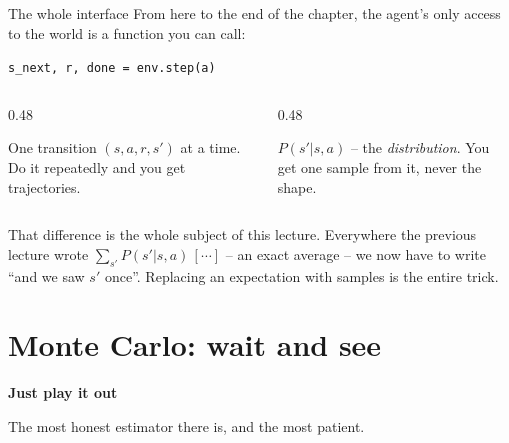 \documentclass[aspectratio=169]{beamer}
\begin{document}
\begin{frame}{The whole interface}
  \small
  From here to the end of the chapter, the agent's only access to the world is a function you
  can call:

  \vskip 6pt
  \begin{center}
  \begin{tcolorbox}[colback=lightbg, colframe=popblue, boxrule=0.7pt, arc=2pt, width=0.72\textwidth]
    \begin{center}
      \texttt{s\_next, r, done = env.step(a)}
    \end{center}
  \end{tcolorbox}
  \end{center}

  \vskip 8pt
  \begin{columns}[T]
    \begin{column}{0.48\textwidth}
      \begin{tcolorbox}[colback=paramgreen!8, colframe=paramgreen, boxrule=0.6pt, arc=2pt,
                        title={\textbf{What you can see}}]
        \small
        One transition $(s, a, r, s')$ at a time. Do it repeatedly and you get trajectories.
      \end{tcolorbox}
    \end{column}
    \begin{column}{0.48\textwidth}
      \begin{tcolorbox}[colback=armred!8, colframe=armred, boxrule=0.6pt, arc=2pt,
                        title={\textbf{What you cannot see}}]
        \small
        $P(s'|s,a)$ -- the \emph{distribution}. You get one sample from it, never the shape.
      \end{tcolorbox}
    \end{column}
  \end{columns}

  \vskip 10pt
  \begin{tcolorbox}[colback=armblue!8, colframe=armblue, boxrule=0.6pt, arc=2pt]
    \small
    That difference is the whole subject of this lecture. Everywhere the previous lecture wrote
    $\sum_{s'} P(s'|s,a)\,[\cdots]$ -- an exact average -- we now have to write ``and we saw
    $s'$ once''. Replacing an expectation with samples is the entire trick.
  \end{tcolorbox}
\end{frame}

\section{Monte Carlo: wait and see}
\begin{frame}[plain]
  \begin{center}
    \vskip 1.6cm
    {\Huge\bfseries\color{popblue}Just play it out}

    \vskip 0.6cm
    {\large The most honest estimator there is, and the most patient.}
  \end{center}
\end{frame}
\end{document}
